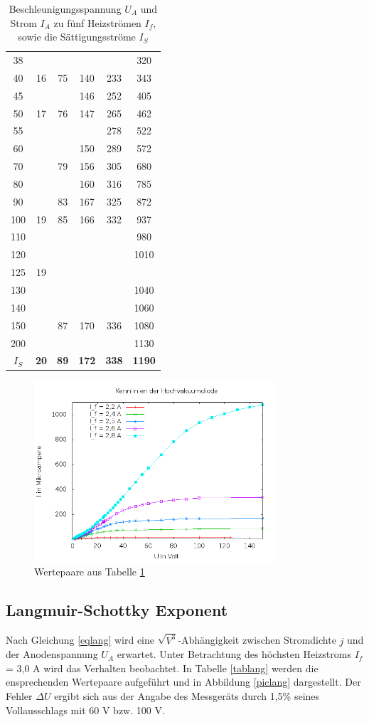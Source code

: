 \begin{table}[H]
\begin{tabular}{|c||c|c|c|c|c|}
38&	&	&	&	&	320\\
40&	16&	75&	140&	233&	343\\
45&	&	&	146&	252&	405\\
50&	17&	76&	147&	265&	462\\
55&	&	&	&	278&	522\\
60&	&	&	150&	289&	572\\
70&	&	79&	156&	305&	680\\
80&	&	&	160&	316&	785\\
90&	&	83&	167&	325&	872\\
100&	19&	85&	166&	332&	937\\
110&	&	&	&	&	980\\
120&	&	&	&	&	1010\\
125&	19&	&	&	&	\\
130	&	&	&	&	&1040\\
140&	&	&	&		&1060\\
150&	&	87&	170&	336&	1080\\
200&	&	&	&	&	1130\\
\hline
\textbf{$I_S$} & \textbf{20} & \textbf{89} & \textbf{172} & \textbf{338} & \textbf{1190} \\
\hline
\end{tabular}
\caption{Beschleunigungsspannung $U_A$ und Strom $I_A$ zu fünf Heizströmen $I_f$, sowie die Sättigungsströme $I_S$}
\label{tabheiz}
\end{table}
\renewcommand{\arraystretch}{1}


\begin{figure}[H]
\includegraphics[width=0.8\textwidth]{pics/504a.png}
\caption{Wertepaare aus Tabelle \ref{tabheiz}}
\label{picheiz}
\end{figure}

\subsection{Langmuir-Schottky Exponent}
\label{expo}
Nach Gleichung \eqref{eqlang} wird eine $\sqrt{V^3}$-Abhängigkeit zwischen Stromdichte $j$ und der Anodenspannung $U_A$ erwartet. Unter
Betrachtung des höchsten Heizstroms $I_f$ = 3,0 A wird das Verhalten beobachtet. In Tabelle \ref{tablang} werden die ensprechenden Wertepaare
aufgeführt und in Abbildung \ref{piclang} dargestellt. Der Fehler $\Delta U$ ergibt sich aus der Angabe des Messgeräts durch 1,5\% seines
Vollausschlags mit 60 V bzw. 100 V. 

